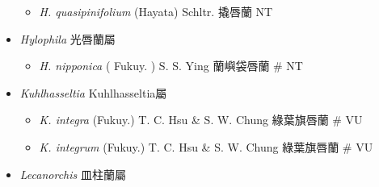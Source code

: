 \begin{itemize}
  \begin{itemize}
        \item[] \textit{H. quasipinifolium} (Hayata) Schltr.  撬唇蘭   NT
  \end{itemize}
 \item[] \textit{Hylophila} 光唇蘭屬
                                
  \begin{itemize}
        \item[] \textit{H. nipponica} ( Fukuy. ) S. S. Ying  蘭嶼袋唇蘭  \# NT
  \end{itemize}
 \item[] \textit{Kuhlhasseltia} Kuhlhasseltia屬
                                
  \begin{itemize}
        \item[] \textit{K. integra} (Fukuy.) T. C. Hsu \& S. W. Chung  綠葉旗唇蘭  \# VU
        \item[] \textit{K. integrum} (Fukuy.) T. C. Hsu \& S. W. Chung  綠葉旗唇蘭  \# VU
  \end{itemize}
 \item[] \textit{Lecanorchis} 皿柱蘭屬
                                

\end{itemize}
